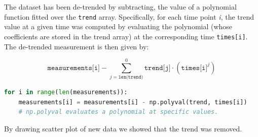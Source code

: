 \documentclass[10pt,a4paper]{article}
\begin{document}

The dataset has been de-trended by subtracting, the value of a polynomial function fitted over the \texttt{trend} array. Specifically, for each time point \emph{i}, the trend value at a given time was computed by evaluating the polynomial (whose coefficients are stored in the trend array) at the corresponding time \texttt{times[i]}. The de-trended measurement is then given by:

\begin{equation*}
  \texttt{measurements[i]} - \sum_{j = \texttt{len(trend)}}^{0}{\texttt{trend[j]} \cdot (\texttt{times[i]}^j)}
\end{equation*}

\begin{lstlisting}[language=python]
for i in range(len(measurements)):
    measurements[i] = measurements[i] - np.polyval(trend, times[i])
    # np.polyval evaluates a polynomial at specific values.
\end{lstlisting}

By drawing scatter plot of new data we showed that the trend was removed.%
\end{document}
